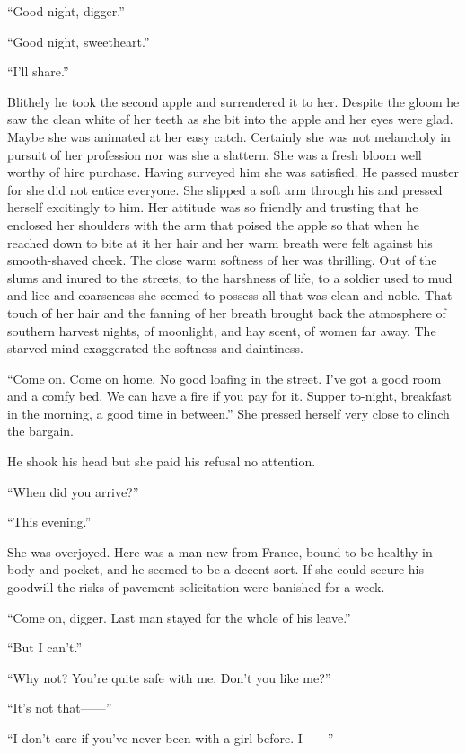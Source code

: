 ``Good night, digger.''

``Good night, sweetheart.''

``I'll share.''

Blithely he took the second apple and surrendered it to her. Despite the gloom he saw the clean white of her teeth as she bit into the apple and her eyes were glad. Maybe she was animated at her easy catch. Certainly she was not melancholy in pursuit of her profession nor was she a slattern. She was a fresh bloom well worthy of hire purchase. Having surveyed him she was satisfied. He passed muster for she did not entice everyone. She slipped a soft arm through his and pressed herself excitingly to him. Her attitude was so friendly and trusting that he enclosed her shoulders with the arm that poised the apple so that when he reached down to bite at it her hair and her warm breath were felt against his smooth-shaved cheek. The close warm softness of her was thrilling. Out of the slums and inured to the streets, to the harshness of life, to a soldier used to mud and lice and coarseness she seemed to possess all that was clean and noble. That touch of her hair and the fanning of her breath brought back the atmosphere of southern harvest nights, of moonlight, and hay scent, of women far away. The starved mind exaggerated the softness and daintiness.

``Come on. Come on home. No good loafing in the street. I've got a good room and a comfy bed. We can have a fire if you pay for it. Supper to-night, breakfast in the morning, a good time in between.'' She pressed herself very close to clinch the bargain.

He shook his head but she paid his refusal no attention.

``When did you arrive?''

``This evening.''

She was overjoyed. Here was a man new from France, bound to be healthy in body and pocket, and he seemed to be a decent sort. If she could secure his goodwill the risks of pavement solicitation were banished for a week.

``Come on, digger. Last man stayed for the whole of his leave.''

``But I can't.''

``Why not? You're quite safe with me. Don't you like me?''

``It's not that------''

``I don't care if you've never been with a girl before. I------''

